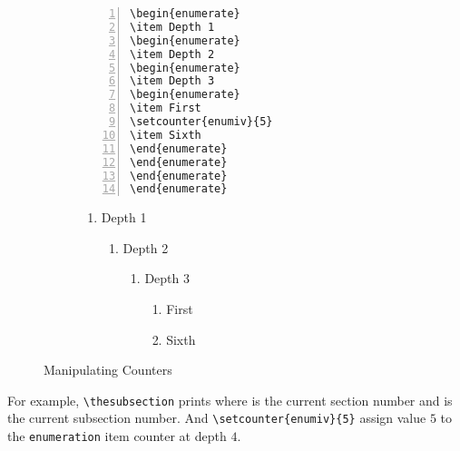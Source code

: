 \documentclass{article}
\theoremstyle{definition}
\theoremstyle{remark}
\begin{document}
\begin{figure}[h]
\centering
\begin{subfigure}{0.45\textwidth}
\begin{Verbatim}[numbers = left]
\begin{enumerate}
\item Depth 1
\begin{enumerate}
\item Depth 2
\begin{enumerate}
\item Depth 3
\begin{enumerate}
\item First
\setcounter{enumiv}{5}
\item Sixth
\end{enumerate}
\end{enumerate}
\end{enumerate}
\end{enumerate}
\end{Verbatim}
\end{subfigure}
\begin{subfigure}{0.45\textwidth}
\begin{enumerate}
\item Depth 1
\begin{enumerate}
\item Depth 2
\begin{enumerate}
\item Depth 3
\begin{enumerate}
\item First
\setcounter{enumiv}{5}
\item Sixth
\end{enumerate}
\end{enumerate}
\end{enumerate}
\end{enumerate}
\end{subfigure} 
\caption{Manipulating Counters}
\label{fig:counter}
\end{figure}

For example, \texttt{\textbackslash thesubsection} prints \thesubsection{} where \thesection{} is the current section number and  is the current subsection number. And \texttt{\textbackslash setcounter\{enumiv\}\{5\}} assign value $5$ to the \texttt{enumeration} item counter at depth $4$.
\end{document}
